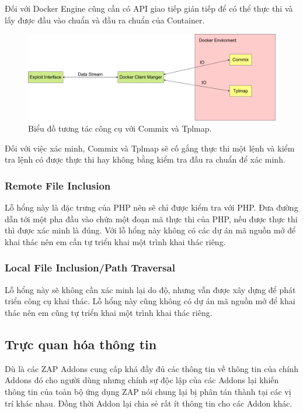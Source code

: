 \documentclass[./../main.tex]{subfiles}
\begin{document}
Đối với Docker Engine cũng cần có API giao tiếp gián tiếp để có thể thực
thi và lấy được đầu vào chuẩn và đầu ra chuẩn của Container.


\begin{figure}[h!]
	\includegraphics[width=\linewidth]{./images/DockerIO.png}
	\caption{Biểu đồ tương tác công cụ với Commix và Tplmap.}
	\label{fig:commix_tplmap}
\end{figure}

Đối với việc xác minh, Commix và Tplmap sẽ cố gắng thực thi một lệnh
và kiểm tra lệnh có được thực thi hay không bằng kiểm tra đầu ra chuẩn
để xác minh.

\subsubsection{Remote File Inclusion}
Lỗ hổng này là đặc trưng của PHP nên sẽ chỉ được kiểm tra với PHP. Đưa
đường dẫn tới một pha đầu vào chứa một đoạn mã thực thi của PHP, nếu
được thực thi thì được xác minh là đúng. Với lỗ hổng này không có các
dự án mã nguồn mở để khai thác nên em cần tự triển khai một trình khai
thác riêng.
\subsubsection{Local File Inclusion/Path Traversal}
Lỗ hổng này sẽ không cần xác minh lại do độ, nhưng vẫn được xây dựng để
phát triển công cụ khai thác. Lỗ hổng này cũng không có dự án mã nguồn
mở để khai thác nên em cũng tự triển khai một trình khai thác riêng.

\subsection{Trực quan hóa thông tin}
Dù là các ZAP Addons cung cấp khá đầy đủ các thông tin về thông tin của
chính Addons đó cho người dùng nhưng chính sự độc lập của các Addons lại
khiến thông tin của toàn bộ ứng dụng ZAP nói chung lại bị phân tán thành
tại các vị trí khác nhau. Đồng thời Addon lại chia sẻ rất ít thông
tin cho các Addon khác.
\end{document}
